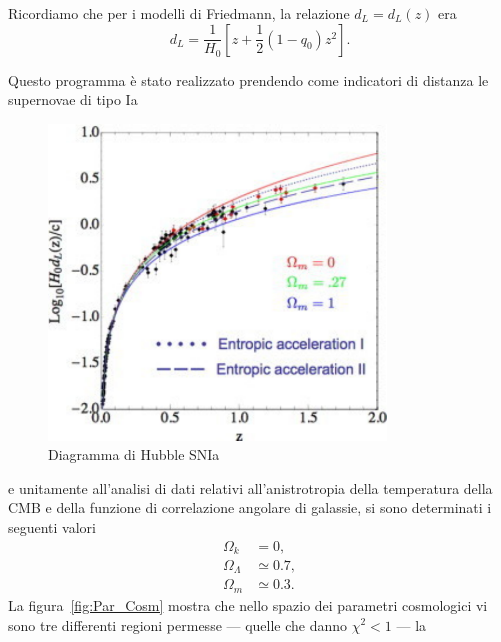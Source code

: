 Ricordiamo che per i modelli di Friedmann, la relazione $d_L=d_L(z)$ era
\begin{equation}
  d_L = \frac {1}{H_0} \left[ z+ \frac{1}{2}(1-q_0)z^2\right].
\end{equation}

Questo programma è stato realizzato prendendo come indicatori di distanza le
supernovae di tipo Ia~\parencites{1998AJ....116.1009R}{1999ApJ...517..565P}
\begin{figure}
  \centering
  \includegraphics[width=0.8\textwidth]{figure/Hubble_Diagr_1_SNIa.pdf}
  \caption{Diagramma di Hubble SNIa}
  \label{fig:DHSN1}
\end{figure}
e unitamente all'analisi di dati relativi all'anistrotropia della temperatura
della CMB e della funzione di correlazione angolare di galassie, si sono
determinati i seguenti valori
\begin{subequations}
  \begin{align}
    \Omega_k &= 0, \\
    \Omega_{\Lambda} &\simeq 0.7, \\
    \Omega_{m} &\simeq 0.3.
  \end{align}
\end{subequations}
La figura~\ref{fig:Par_Cosm} mostra che nello spazio dei parametri cosmologici
vi sono tre differenti regioni permesse --- quelle che danno $\chi^2<1$ --- la
